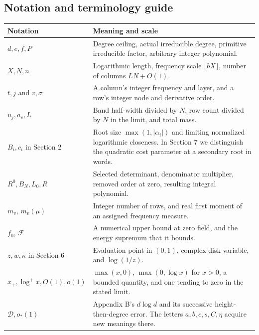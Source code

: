 \documentclass[11pt,a4paper]{article}
\newcounter{none}
\providecommand{\real}[1]{#1}
\begin{document}
\subsection{Notation and terminology guide}\label{notation-and-terminology-guide}

{\def\LTcaptype{none} %
{\small
\begin{longtable}[]{@{}
  >{\raggedright\arraybackslash}p{(\linewidth - 2\tabcolsep) * \real{0.22}}
  >{\raggedright\arraybackslash}p{(\linewidth - 2\tabcolsep) * \real{0.78}}@{}}
\toprule\noalign{}
\begin{minipage}[b]{\linewidth}\raggedright
Notation
\end{minipage} & \begin{minipage}[b]{\linewidth}\raggedright
Meaning and scale
\end{minipage} \\
\midrule\noalign{}
\endhead
\bottomrule\noalign{}
\endlastfoot
\(d,e,f,P\) & Degree ceiling, actual irreducible degree, primitive irreducible factor, arbitrary integer polynomial. \\
\(X,N,n\) & Logarithmic length, frequency scale \(\lfloor bX\rfloor\), number of columns \(LN+O(1)\). \\
\(t,j\) and \(v,\sigma\) & A column's integer frequency and layer, and a row's integer node and derivative order. \\
\(u_j,a_v,L\) & Band half-width divided by \(N\), row count divided by \(N\) in the limit, and total mass. \\
\(B_i,c_i\) in Section 2 & Root size \(\max(1,\lvert\alpha_i\rvert)\) and limiting normalized logarithmic closeness. In Section 7 we distinguish the quadratic cost parameter at a secondary root in words. \\
\(R^0,B_N,L_0,R\) & Selected determinant, denominator multiplier, removed order at zero, resulting integral polynomial. \\
\(m_v\), \(m_v(\mu)\) & Integer number of rows, and real first moment of an assigned frequency measure. \\
\(f_0\), \(\mathcal F\) & A numerical upper bound at zero field, and the energy supremum that it bounds. \\
\(z,w,\kappa\) in Section 6 & Evaluation point in \((0,1)\), complex disk variable, and \(\log(1/z)\). \\
\(x_+,\log^+ x,O(1),o(1)\) & \(\max(x,0)\), \(\max(0,\log x)\) for \(x>0\), a bounded quantity, and one tending to zero in the stated limit. \\
\(\mathscr D,o_*(1)\) & Appendix B's \(d\log d\) and its successive height-then-degree error. The letters \(a,b,c,s,C,\eta\) acquire new meanings there. \\
\end{longtable}
}
}
\end{document}
